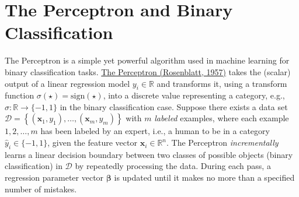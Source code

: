 \documentclass{article}[12pt]
\begin{document}
\section{The Perceptron and Binary Classification}
The Perceptron \cite{Perceptron1960} is a simple yet powerful algorithm used in machine learning for binary classification tasks.
\href{https://en.wikipedia.org/wiki/Perceptron}{The Perceptron (Rosenblatt, 1957)} takes the (scalar) output of a linear regression model $y_{i}\in\mathbb{R}$ and transforms it, using a transform function $\sigma(\star) = \text{sign}(\star)$, into a discrete value representing a category, e.g., $\sigma:\mathbb{R}\rightarrow\{-1,1\}$ in the binary classification case. 
Suppose there exists a data set $\mathcal{D} = \left\{(\mathbf{x}_{1},y_{1}),\dotsc,(\mathbf{x}_{m},y_{m})\right\}$ with $m$ \textit{labeled} examples, where each example $1,2,\dots,m$ has been labeled by an expert, i.e., a human to be in a category $\hat{y}_{i}\in\{-1,1\}$, given the feature vector $\mathbf{x}_{i}\in\mathbb{R}^{n}$. 
The Perceptron \textit{incrementally} learns a linear decision boundary between two classes of possible objects (binary classification) in $\mathcal{D}$ by repeatedly processing the data. 
During each pass, a regression parameter vector $\mathbf{\beta}$ is updated until it makes no more than a specified number of mistakes. 
\end{document}
